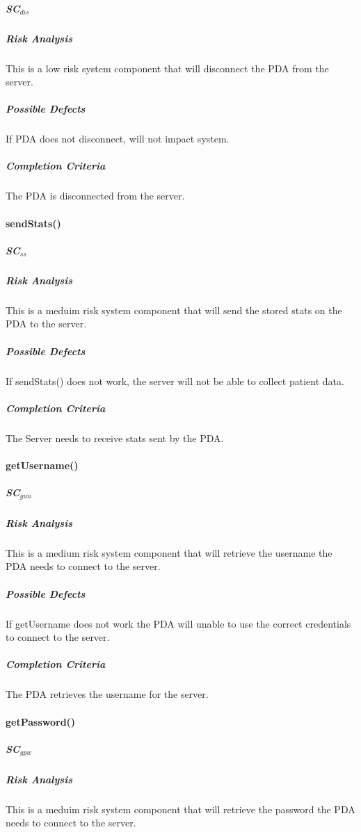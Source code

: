 \documentclass{article}
\begin{document}
\subparagraph{SC$_{dis}$}

\subparagraph{Risk Analysis}
This is a low risk system component that will disconnect the PDA from the server.

\subparagraph{Possible Defects}
If PDA does not disconnect, will not impact system.

\subparagraph{Completion Criteria}
The PDA is disconnected from the server.

\paragraph{sendStats()}

\subparagraph{SC$_{ss}$}

\subparagraph{Risk Analysis}
This is a meduim risk system component that will send the stored stats on the PDA to the server.

\subparagraph{Possible Defects}
If sendStats() does not work, the server will not be able to collect patient data.

\subparagraph{Completion Criteria}
The Server needs to receive stats sent by the PDA.

\paragraph{getUsername()}

\subparagraph{SC$_{gun}$}

\subparagraph{Risk Analysis}
This is a medium risk system component that will retrieve the username the PDA needs to connect to the server.

\subparagraph{Possible Defects}
If getUsername does not work the PDA will unable to use the correct credentials to connect to the server.

\subparagraph{Completion Criteria}
The PDA retrieves the username for the server.

\paragraph{getPassword()}

\subparagraph{SC$_{gpw}$}

\subparagraph{Risk Analysis}
This is a meduim risk system component that will retrieve the password the PDA needs to connect to the server.
\end{document}
